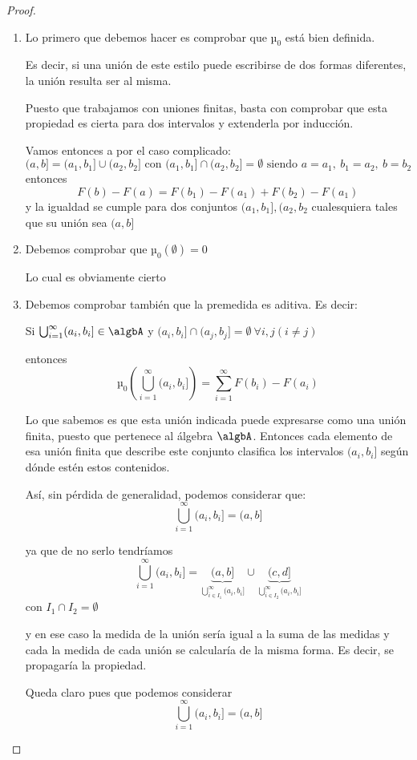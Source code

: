 \documentclass{apuntes}
\begin{document}
\begin{proof}
\begin{enumerate}
\item Lo primero que debemos hacer es comprobar que $µ_0$ está bien definida.

Es decir, si una unión de este estilo puede escribirse de dos formas diferentes, la unión resulta ser al misma.

Puesto que trabajamos con uniones finitas, basta con comprobar que esta propiedad es cierta para dos intervalos y extenderla por inducción.

Vamos entonces a por el caso complicado:
\[(a,b]=(a_1,b_1]\cup (a_2, b_2] \text{ con } (a_1,b_1]\cap (a_2, b_2] = \emptyset \text{ siendo } a=a_1, \ b_1 = a_2, \ b=b_2\]
entonces
\[F(b)-F(a)=F(b_1)-F(a_1)+F(b_2)-F(a_1)\]
y la igualdad se cumple para dos conjuntos $(a_1,b_1], (a_2, b_2$ cualesquiera tales que su unión sea $(a,b]$

\item Debemos comprobar que $µ_0(\emptyset)=0$

Lo cual es obviamente cierto

\item Debemos comprobar también que la premedida es aditiva. Es decir:

Si $\bigcup_{i=1}^{\infty}(a_i, b_i] \in \algbA$ y $(a_i, b_i] \cap (a_j, b_j] = \emptyset \ \forall i,j (i\neq j)$

entonces
\[µ_0\left(\bigcup_{i=1}^{\infty}(a_i, b_i]\right)=\sum_{i=1}^{\infty} F(b_i)-F(a_i)\]

Lo que sabemos es que esta unión indicada puede expresarse como una unión finita, puesto que pertenece al álgebra $\algbA$. Entonces cada elemento de esa unión finita que describe este conjunto clasifica los intervalos $(a_i, b_i]$ según dónde estén estos contenidos.

Así, sin pérdida de generalidad, podemos considerar que:
\[\bigcup_{i=1}^{\infty}(a_i, b_i] = (a,b]\]

ya que de no serlo tendríamos
\[\bigcup_{i=1}^{\infty}(a_i, b_i] = \underbrace{(a,b]}_{\bigcup_{i\in I_1}^{\infty}(a_i, b_i]} \cup \underbrace{(c,d]}_{\bigcup_{i\in I_2}^{\infty}(a_i, b_i]}\]
con $I_1 \cap I_2 = \emptyset$

y en ese caso la medida de la unión sería igual a la suma de las medidas y cada la medida de cada unión se calcularía de la misma forma. Es decir, se propagaría la propiedad.

Queda claro pues que podemos considerar
\[\bigcup_{i=1}^{\infty}(a_i, b_i] = (a,b]\]


\end{enumerate}
\end{proof}
\end{document}

